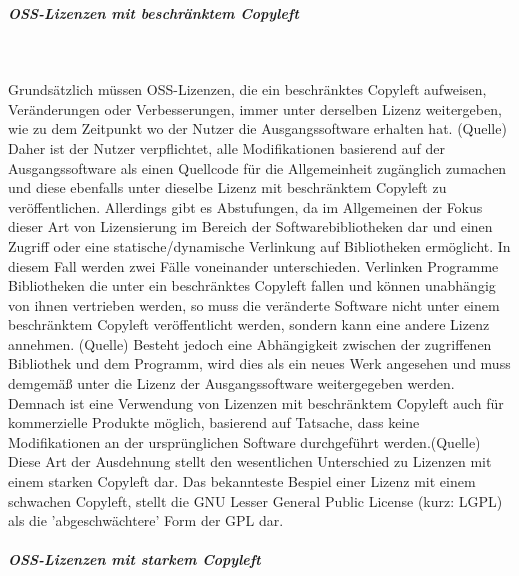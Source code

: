 \subparagraph{OSS-Lizenzen mit beschränktem Copyleft}$~$

Grundsätzlich müssen OSS-Lizenzen, die ein beschränktes Copyleft aufweisen, Veränderungen oder Verbesserungen, immer unter derselben Lizenz weitergeben, wie zu dem Zeitpunkt wo der Nutzer die Ausgangssoftware erhalten hat. (Quelle) Daher ist der Nutzer verpflichtet, alle Modifikationen basierend auf der Ausgangssoftware als einen Quellcode für die Allgemeinheit zugänglich zumachen und diese ebenfalls unter dieselbe Lizenz mit beschränktem Copyleft zu veröffentlichen. Allerdings gibt es Abstufungen, da im Allgemeinen der Fokus dieser Art von Lizensierung im Bereich der Softwarebibliotheken dar und einen Zugriff oder eine statische/dynamische Verlinkung auf Bibliotheken ermöglicht. In diesem Fall werden zwei Fälle voneinander unterschieden. Verlinken Programme Bibliotheken die unter ein beschränktes Copyleft fallen und können unabhängig von ihnen vertrieben werden, so muss die veränderte Software nicht unter einem beschränktem Copyleft veröffentlicht werden, sondern kann eine andere Lizenz annehmen. (Quelle) Besteht jedoch eine Abhängigkeit zwischen der zugriffenen Bibliothek und dem Programm, wird dies als ein neues Werk angesehen und muss demgemäß unter die Lizenz der Ausgangssoftware weitergegeben werden. Demnach ist eine Verwendung von Lizenzen mit beschränktem Copyleft auch für kommerzielle Produkte möglich, basierend auf Tatsache, dass keine Modifikationen an der ursprünglichen Software durchgeführt werden.(Quelle) Diese Art der Ausdehnung stellt den wesentlichen Unterschied zu Lizenzen mit einem starken Copyleft dar. Das bekannteste Bespiel einer Lizenz mit einem schwachen Copyleft, stellt die GNU Lesser General Public License (kurz: LGPL) als die 'abgeschwächtere' Form der GPL dar. 

\subparagraph{OSS-Lizenzen mit starkem Copyleft}$~$

